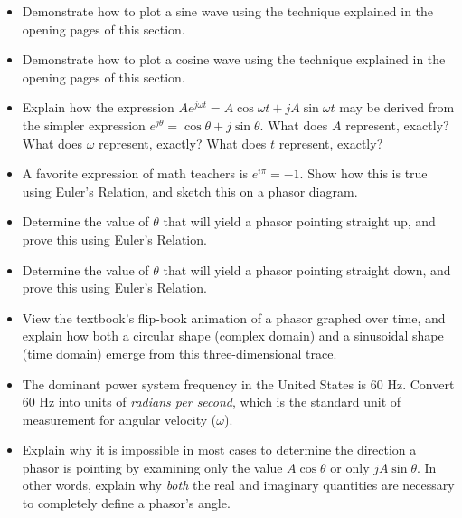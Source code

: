 \begin{itemize}
\item{} Demonstrate how to plot a sine wave using the technique explained in the opening pages of this section.
\item{} Demonstrate how to plot a cosine wave using the technique explained in the opening pages of this section.
\item{} Explain how the expression $Ae^{j \omega t} = A \cos \omega t + j A \sin \omega t$ may be derived from the simpler expression $e^{j \theta} = \cos \theta + j \sin \theta$.  What does $A$ represent, exactly?  What does $\omega$ represent, exactly?  What does $t$ represent, exactly?
\item{} A favorite expression of math teachers is $e^{i \pi} = -1$.  Show how this is true using Euler's Relation, and sketch this on a phasor diagram.
\item{} Determine the value of $\theta$ that will yield a phasor pointing straight up, and prove this using Euler's Relation.
\item{} Determine the value of $\theta$ that will yield a phasor pointing straight down, and prove this using Euler's Relation.
\item{} View the textbook's flip-book animation of a phasor graphed over time, and explain how both a circular shape (complex domain) and a sinusoidal shape (time domain) emerge from this three-dimensional trace.
\item{} The dominant power system frequency in the United States is 60 Hz.  Convert 60 Hz into units of {\it radians per second}, which is the standard unit of measurement for angular velocity ($\omega$).
\item{} Explain why it is impossible in most cases to determine the direction a phasor is pointing by examining only the value $A \cos \theta$ or only $j A \sin \theta$.  In other words, explain why {\it both} the real and imaginary quantities are necessary to completely define a phasor's angle.
\end{itemize}




